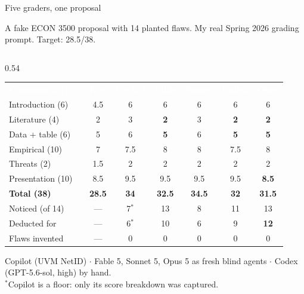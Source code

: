 \documentclass[aspectratio=169, 10pt]{beamer}
\begin{document}
\iffalse
\begin{frame}{Five graders, one proposal}
\vskip-8pt
{\footnotesize A fake ECON 3500 proposal with 14 planted flaws. My real Spring 2026 grading prompt. Target: 28.5/38.\par}
\vskip2pt
\begin{columns}[T]
\begin{column}{0.54\textwidth}
{\scriptsize
\setlength{\tabcolsep}{3pt}
\renewcommand{\arraystretch}{1.05}
\begin{tabular}{>{\raggedright\arraybackslash}m{2.05cm} c c c c c c}
\rowcolor{SlateTeal}
\textcolor{white}{\textbf{Component (pts)}} & \textcolor{white}{\textbf{Key}} & \textcolor{white}{\textbf{Copilot}} & \textcolor{white}{\textbf{Fable}} & \textcolor{white}{\textbf{Sonnet}} & \textcolor{white}{\textbf{Codex}} & \textcolor{white}{\textbf{Opus}} \\
\rowcolor{PaleSage} Introduction (6) & 4.5 & 6 & 6 & 6 & 6 & 6 \\
\rowcolor{white}    Literature (4) & 2 & 3 & \textbf{2} & 3 & \textbf{2} & \textbf{2} \\
\rowcolor{PaleSage} Data + table (6) & 5 & 6 & \textbf{5} & 6 & \textbf{5} & \textbf{5} \\
\rowcolor{white}    Empirical (10) & 7 & 7.5 & 8 & 8 & 7.5 & 8 \\
\rowcolor{PaleSage} Threats (2) & 1.5 & 2 & 2 & 2 & 2 & 2 \\
\rowcolor{white}    Presentation (10) & 8.5 & 9.5 & 9.5 & 9.5 & 9.5 & \textbf{8.5} \\
\rowcolor{LightGold} \textbf{Total (38)} & \textbf{28.5} & \textbf{34} & \textbf{32.5} & \textbf{34.5} & \textbf{32} & \textbf{31.5} \\
\rowcolor{white}    Noticed (of 14) & --- & 7$^{*}$ & 13 & 8 & 11 & 13 \\
\rowcolor{PaleSage} Deducted for & --- & 6$^{*}$ & 10 & 6 & 9 & \textbf{12} \\
\rowcolor{white}    Flaws invented & --- & 0 & 0 & 0 & 0 & 0 \\
\end{tabular}
}
\vskip4pt
{\scriptsize\color{CoolGray} Copilot (UVM NetID) $\cdot$ Fable 5, Sonnet 5, Opus 5 as fresh blind agents $\cdot$ Codex (GPT-5.6-sol, high) by hand.\\
$^{*}$Copilot is a floor: only its score breakdown was captured.\par}

\end{column}
\end{columns}
\end{frame}
\end{document}
